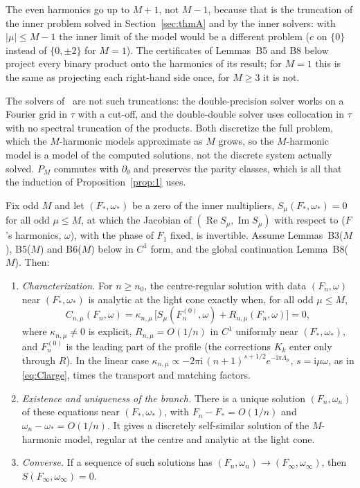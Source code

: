 \documentclass{amsart}
\numberwithin{equation}{section}
\theoremstyle{plain}
\newenvironment{thmnamed}[1]{\renewcommand\theinnerthm{#1}\innerthm}{\endinnerthm}
\theoremstyle{definition}
\theoremstyle{remark}
\newcommand{\re}{\operatorname{Re}}
\newcommand{\im}{\operatorname{Im}}
\newcommand{\iu}{\mathrm{i}}
\begin{document}
The even harmonics go up to $M + 1$, not $M - 1$, because that is the truncation of the inner problem solved in
Section~\ref{sec:thmA} and by the inner solvers: with $|\mu| \le M - 1$ the inner limit of the model would be a different
problem ($c$ on $\{0\}$ instead of $\{0, \pm2\}$ for $M = 1$). The certificates of Lemmas~B5 and B8 below project every binary
product onto the harmonics of its result; for $M = 1$ this is the same as projecting each right-hand side once, for
$M \ge 3$ it is not.

The solvers of~\cite{companion} are not such truncations: the double-precision solver works on a Fourier grid in $\tau$
with a cut-off, and the double-double solver uses collocation in $\tau$ with no spectral truncation of the products. Both
discretize the full problem, which the $M$-harmonic models approximate as $M$ grows, so the $M$-harmonic model is a model
of the computed solutions, not the discrete system actually solved. $P_M$ commutes with $\partial_\theta$ and
preserves the parity classes, which is all that the induction of Proposition~\ref{prop:1} uses.

\begin{thmnamed}{B($M$)}\label{thm:B}
Fix odd $M$ and let $(F_*, \omega_*)$ be a zero of the inner multipliers, $S_\mu(F_*, \omega_*) = 0$ for all odd
$\mu \le M$, at which the Jacobian of $(\re S_\mu, \im S_\mu)$ with respect to ($F$'s harmonics, $\omega$), with the phase of
$F_1$ fixed, is invertible. Assume Lemmas~B3($M$), B5($M$) and B6($M$) below in $C^1$ form, and the global continuation
Lemma~B8($M$). Then:
\begin{enumerate}[label=(\arabic*),leftmargin=2em]
\item \emph{Characterization.} For $n \ge n_0$, the centre-regular solution with data $(F_n, \omega)$ near
$(F_*, \omega_*)$ is analytic at the light cone exactly when, for all odd $\mu \le M$,
\begin{equation}\label{eq:Cnmu}
C_{n,\mu}(F_n, \omega) = \kappa_{n,\mu}\,\big[S_\mu(F_n^{(0)}, \omega) + R_{n,\mu}(F_n, \omega)\big] = 0 ,
\end{equation}
where $\kappa_{n,\mu} \ne 0$ is explicit, $R_{n,\mu} = O(1/n)$ in $C^1$ uniformly near $(F_*, \omega_*)$, and
$F_n^{(0)}$ is the leading part of the profile (the corrections $K_k$ enter only through $R$). In the linear case
$\kappa_{n,\mu} \propto -2\pi\iu\,(n+1)^{s+1/2}e^{-\iu\pi\Lambda_\mu}$, $s = \iu\mu\omega$, as in \eqref{eq:Clarge}, times the
transport and matching factors.
\item \emph{Existence and uniqueness of the branch.} There is a unique solution $(F_n, \omega_n)$ of these equations near
$(F_*, \omega_*)$, with $F_n - F_* = O(1/n)$ and $\omega_n - \omega_* = O(1/n)$. It gives a discretely self-similar solution
of the $M$-harmonic model, regular at the centre and analytic at the light cone.
\item \emph{Converse.} If a sequence of such solutions has $(F_n, \omega_n) \to (F_\infty, \omega_\infty)$, then
$S(F_\infty, \omega_\infty) = 0$.
\end{enumerate}
\end{thmnamed}
\end{document}
